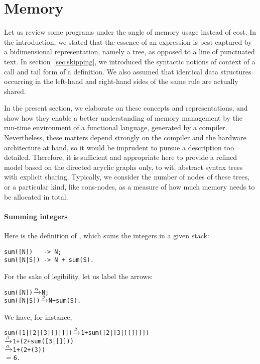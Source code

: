 \section{Memory}
\label{sec:memory}

Let us review some programs under the angle of memory usage instead of cost. In the introduction, we stated that the essence of an expression is best captured by a bidimensional representation, namely a tree, as opposed to a line of punctuated text. In section~\vref{sec:skipping}, we introduced the syntactic notions of context of a call and tail form of a definition. We also assumed that identical data structures occurring in the left\hyp{}hand and right\hyp{}hand sides of the same rule are actually shared.

In the present section, we elaborate on these concepts and
representations, and show how they enable a better understanding of
memory management by the run\hyp{}time environment of a functional
language, generated by a compiler. Nevertheless, these matters depend
strongly on the compiler and the hardware architecture at hand, so it
would be imprudent to pursue a description too detailed. Therefore, it
is sufficient and appropriate here to provide a refined model based on
the directed acyclic graphs only, to wit, abstract syntax trees with
explicit sharing. Typically, we consider the number of nodes of these
trees, or a particular kind, like cons\hyp{}nodes, as
a measure of how much memory needs to be allocated in total.

\paragraph{Summing integers}

Here is the definition of , which sums the integers in
a given stack:
\begin{verbatim}
sum([N])   -> N;
sum([N|S]) -> N + sum(S).
\end{verbatim}
For the sake of legibility, let us label the arrows:
\begin{alltt}
sum([N])   \(\xrightarrow{\smash[t]{\alpha}}\) N;
sum([N|S]) \(\xrightarrow{\smash[t]{\beta}}\) N + sum(S).
\end{alltt}
We have, for instance,
\begin{alltt}
sum([1|[2|[3|[]]]]) \(\xrightarrow{\smash[t]{\beta}}\) 1 + sum([2|[3|[[]]]])
                    \(\xrightarrow{\smash[t]{\beta}}\) 1 + (2 + sum([3|[]]))
                    \(\xrightarrow{\smash[t]{\alpha}}\) 1 + (2 + (3))
                    \(=\) 6.
\end{alltt}

